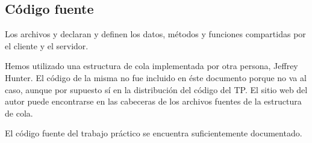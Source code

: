 \subsection{Código fuente}

Los archivos  y  declaran y definen los
datos, métodos y funciones compartidas por el cliente y el servidor.

Hemos utilizado una estructura de cola implementada por otra persona, Jeffrey
Hunter. El código de la misma no fue incluido en éste documento porque no va al
caso, aunque por supuesto sí en la distribución del código del TP. El sitio web
del autor puede encontrarse en las cabeceras de los archivos fuentes de la
estructura de cola.

El código fuente del trabajo práctico se encuentra suficientemente documentado.






